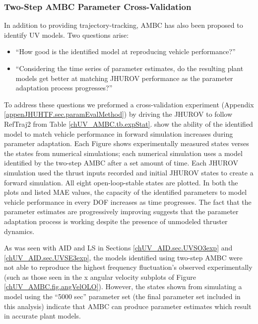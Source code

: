 \subsubsection{Two-Step \ac{AMBC} Parameter Cross-Validation}

In addition to providing trajectory-tracking, \ac{AMBC} has also been
proposed to identify \ac{UV} models.
%
Two questions arise: 
%
\begin{itemize}
\item ``How good is the identified model at reproducing vehicle performance?''
%
\item``Considering the time series of parameter estimates, do the
  resulting plant models get better at matching \ac{JHUROV}
  performance as the parameter adaptation process progresses?''
\end{itemize}
%

To address these questions we preformed a cross-validation experiment
(Appendix \ref{appenJHUHTF.sec.paramEvalMethod}) by driving the
\ac{JHUROV} to follow RefTraj2 from Table \ref{chUV_AMBC.tb.expStat}.
%
show the ability of the identified model to match vehicle performance
in forward simulation increases during parameter adaptation.
%
Each Figure shows experimentally measured states verses the states
from numerical simulations; each numerical simulation uses a model
identified by the two-step \ac{AMBC} after a set amount of time.
%
Each \ac{JHUROV} simulation used the thrust inputs recorded and
initial \ac{JHUROV} states to create a forward
simulation. %
%
All eight open-loop-stable states are plotted.
%
In both the plots and listed \ac{MAE} values, the capacity of the
identified parameters to model vehicle performance in every \ac{DOF}
increases as time progresses.
%
The fact that the parameter estimates are progressively improving
suggests that the parameter adaptation process is working despite the
presence of unmodeled thruster dynamics.



As was seen with \ac{AID} and \ac{LS} in Sections
\ref{chUV_AID.sec.UVSO3exp} and \ref{chUV_AID.sec.UVSE3exp}, the
models identified using two-step \ac{AMBC} were not able to reproduce
the highest frequency fluctuation's observed experimentally (such as
those seen in the x angular velocity subplots of Figure
\ref{chUV_AMBC.fig.angVelOLO}).
%
However, the states shown from simulating a model using the ``5000
sec'' parameter set (the final parameter set included in this
analysis) indicate that \ac{AMBC} can produce parameter estimates
which result in accurate plant models.




